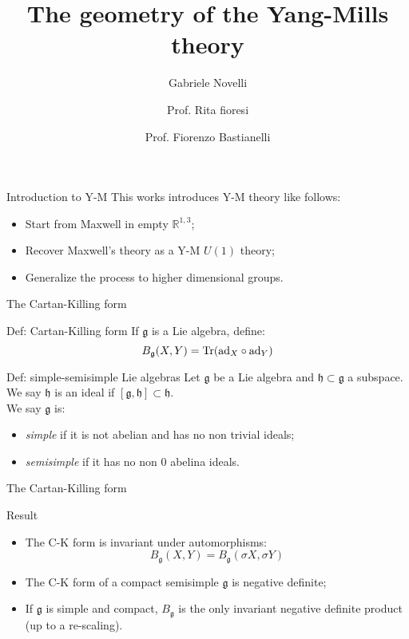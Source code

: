 \documentclass{beamer}
\title{The geometry of the Yang-Mills theory}
\date{}
\author{Gabriele Novelli \and Prof. Rita fioresi \and Prof. Fiorenzo Bastianelli}
\institute{University of Bologna}
\begin{document}
\begin{frame}[plain]
    \maketitle
\end{frame}
\begin{frame}{Introduction to Y-M}
	This works introduces Y-M theory like follows:
	\begin{itemize}
		\item Start from Maxwell in empty 
		$\mathbb{R}^{1,3}$;
		\item Recover Maxwell's theory as a Y-M $U(1)$ theory;
		\item Generalize the process to higher dimensional groups. 
	\end{itemize}
\end{frame}
\begin{frame}{The Cartan-Killing form}
	\begin{exampleblock}{Def: Cartan-Killing form}
		If $\mathfrak{g}$ is a Lie algebra, define:
		$$B_\mathfrak{g}(X,Y)=\hbox{Tr}(\hbox{ad}_X\circ \hbox{ad}_Y)$$
	\end{exampleblock}
	\begin{exampleblock}{Def: simple-semisimple Lie algebras}
		Let $\mathfrak{g}$ be a Lie algebra and $\mathfrak{h}\subset \mathfrak{g}$ a subspace. We say $\mathfrak{h}$ is an ideal if $[\mathfrak{g},\mathfrak{h}]\subset\mathfrak{h}$. \\
		We say $\mathfrak{g}$ is:
		\begin{itemize}
			\item \textit{simple} if it is not abelian and has no non trivial ideals;
			\item \textit{semisimple} if it has no non 0 abelina ideals.
		\end{itemize}
	\end{exampleblock}
\end{frame}
\begin{frame}{The Cartan-Killing form}
	\begin{block}{Result}
		\begin{itemize}
			\item The C-K form is invariant under automorphisms: $$B_\mathfrak{g}(X,Y)=B_\mathfrak{g}(\sigma X,\sigma Y)$$
			\item The C-K form of a compact semisimple $\mathfrak{g}$ is negative definite;
			\item If $\mathfrak{g}$ is simple and compact, $B_\mathfrak{g}$ is the only invariant negative definite product (up to a re-scaling).
			
		\end{itemize}
	\end{block}
\end{frame}
\end{document}
